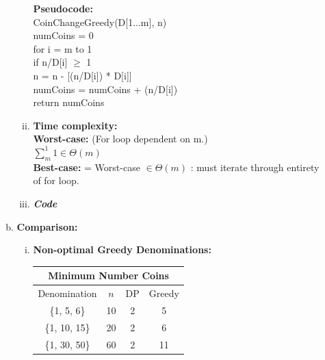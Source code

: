 \documentclass[11pt]{article}
\begin{document}
\begin{enumerate}
\begin{enumerate}[(a)]
\begin{enumerate}[(i)]
					\textbf{Pseudocode:} \\
						\hspace*{.5cm}
						CoinChangeGreedy(D[1...m],  n) \\
							\hspace*{1cm}
							numCoins = 0 \\
							\hspace*{1cm}
							 for i = m to 1\\
								\hspace*{1.5cm}
								if n/D[i] $ \geq $ 1 \\
									\hspace*{2cm}
									n = n - [(n/D[i]) * D[i]] \\
									\hspace*{2cm}
									numCoins = numCoins + (n/D[i]) \\
							\hspace*{1cm}
							return numCoins \\

				\item
					\textbf{Time complexity:} \\
						\hspace*{.5cm}
						\textbf{Worst-case:} (For loop dependent on m.) \\
							\hspace*{1cm}
							$ \sum_{m}^{1} 1 \in \Theta(m) $ \\
							
						\hspace*{.5cm}
						\textbf{Best-case:} = Worst-case $ \in \Theta(m) $ : must iterate through entirety of for loop. \\
					
				\item
					\textbf{\textit{Code}} \\
					
			
			\end{enumerate}
		\item
			\textbf{Comparison:} \\
			\begin{enumerate}[(i)]
				\item
					\textbf{Non-optimal Greedy Denominations:} \\
						\hspace*{.5cm}
						\begin{tabular}{ |c|c||c|c| }
							\hline
							\multicolumn{4}{|c|}{\textbf{Minimum Number Coins}} \\
							\hline
							Denomination & $ n $ & DP & Greedy \\
							\hline
							\{1, 5, 6\}& 10 & 2 & 5 \\
							\hline
							\{1, 10, 15\}& 20 & 2 & 6 \\ 
							\hline
							\{1, 30, 50\}& 60 & 2 & 11 \\ 
							\hline
						\end{tabular}
						\vspace{5mm}
					

\end{enumerate}
\end{enumerate}
\end{enumerate}
\end{document}
